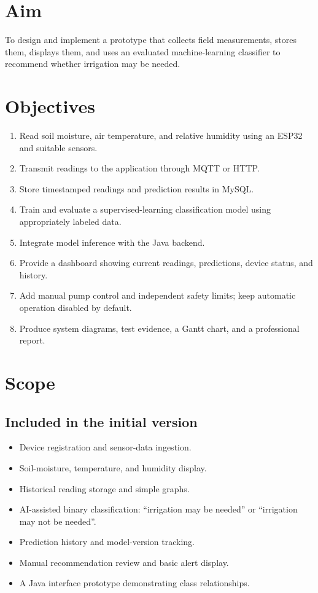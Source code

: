 \documentclass[12pt,a4paper]{report}
\begin{document}
\section{Aim}
To design and implement a prototype that collects field measurements, stores them, displays them, and uses an evaluated machine-learning classifier to recommend whether irrigation may be needed.

\section{Objectives}
\begin{enumerate}[leftmargin=*]
\item Read soil moisture, air temperature, and relative humidity using an ESP32 and suitable sensors.
\item Transmit readings to the application through MQTT or HTTP.
\item Store timestamped readings and prediction results in MySQL.
\item Train and evaluate a supervised-learning classification model using appropriately labeled data.
\item Integrate model inference with the Java backend.
\item Provide a dashboard showing current readings, predictions, device status, and history.
\item Add manual pump control and independent safety limits; keep automatic operation disabled by default.
\item Produce system diagrams, test evidence, a Gantt chart, and a professional report.
\end{enumerate}

\section{Scope}
\subsection{Included in the initial version}
\begin{itemize}[leftmargin=*]
\item Device registration and sensor-data ingestion.
\item Soil-moisture, temperature, and humidity display.
\item Historical reading storage and simple graphs.
\item AI-assisted binary classification: ``irrigation may be needed'' or ``irrigation may not be needed''.
\item Prediction history and model-version tracking.
\item Manual recommendation review and basic alert display.
\item A Java interface prototype demonstrating class relationships.
\end{itemize}
\end{document}

